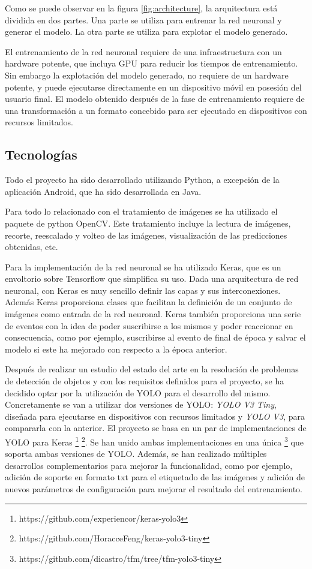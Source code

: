 Como se puede observar en la figura \ref{fig:architecture}, la arquitectura está dividida en dos partes. Una parte se utiliza para entrenar la red neuronal y generar el modelo. La otra parte se utiliza para explotar el modelo generado.

El entrenamiento de la red neuronal requiere de una infraestructura con un hardware potente, que incluya GPU para reducir los tiempos de entrenamiento. Sin embargo la explotación del modelo generado, no  requiere de un hardware potente, y puede ejecutarse directamente en un dispositivo móvil en posesión del usuario final. El modelo obtenido después de la fase de entrenamiento requiere de una transformación a un formato concebido para ser ejecutado en dispositivos con recursos limitados.

\subsection{Tecnologías}

Todo el proyecto ha sido desarrollado utilizando Python, a excepción de la aplicación Android, que ha sido desarrollada en Java.

Para todo lo relacionado con el tratamiento de imágenes se ha utilizado el paquete de python OpenCV. Este tratamiento incluye la lectura de imágenes, recorte, reescalado y volteo de las imágenes, visualización de las predicciones obtenidas, etc.

Para la implementación de la red neuronal se ha utilizado Keras, que es un envoltorio sobre Tensorflow que simplifica su uso. Dada una arquitectura de red neuronal, con Keras es muy sencillo definir las capas y sus interconexiones. Además Keras proporciona clases que facilitan la definición de un conjunto de imágenes como entrada de la red neuronal. Keras también proporciona una serie de eventos con la idea de poder suscribirse a los mismos y poder reaccionar en consecuencia, como por ejemplo, suscribirse al evento de final de época y salvar el modelo si este ha mejorado con respecto a la época anterior.

Después de realizar un estudio del estado del arte en la resolución de problemas de detección de objetos y con los requisitos definidos para el proyecto, se ha decidido optar por la utilización de YOLO para el desarrollo del mismo. Concretamente se van a utilizar dos versiones de YOLO: \textit{YOLO V3 Tiny}, diseñada para ejecutarse en dispositivos con recursos limitados y \textit{YOLO V3}, para compararla con la anterior. El proyecto se basa en un par de implementaciones de YOLO para Keras \footnote{https://github.com/experiencor/keras-yolo3} \footnote{https://github.com/HoracceFeng/keras-yolo3-tiny}. Se han unido ambas implementaciones en una única \footnote{https://github.com/dicastro/tfm/tree/tfm-yolo3-tiny} que soporta ambas versiones de YOLO. Además, se han realizado múltiples desarrollos complementarios para mejorar la funcionalidad, como por ejemplo, adición de soporte en formato txt para el etiquetado de las imágenes y adición de nuevos parámetros de configuración para mejorar el resultado del entrenamiento.

